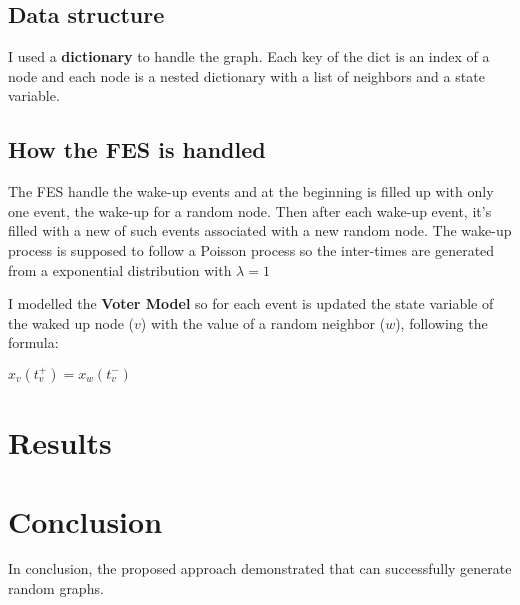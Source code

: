 \documentclass[conference]{IEEEtran}
\begin{document}
    \subsection{Data structure}

    I used a \textbf{dictionary} to handle the graph. Each key of the dict is an index of a node and each node is a nested dictionary with a list of neighbors and a state variable.

    \subsection{How the FES is handled}

    The FES handle the wake-up events and at the beginning is filled up with only one event, the wake-up for a random node. 
    Then after each wake-up event, it's filled with a new of such events associated with a new random node.
    The wake-up process is supposed to follow a Poisson process so the inter-times are generated from a exponential distribution with $\lambda=1$

    I modelled the \textbf{Voter Model} so for each event is updated the state variable of the waked up node ($v$) with the value of a random neighbor ($w$), following the formula:
    \begin{center}
        \begin{math}
            x_v(t_v^+) = x_w(t_v^-)
        \end{math}
    \end{center}

\section{Results}



    
\section{Conclusion}

In conclusion, the proposed approach demonstrated that can successfully generate random graphs.

%
%
\end{document}

